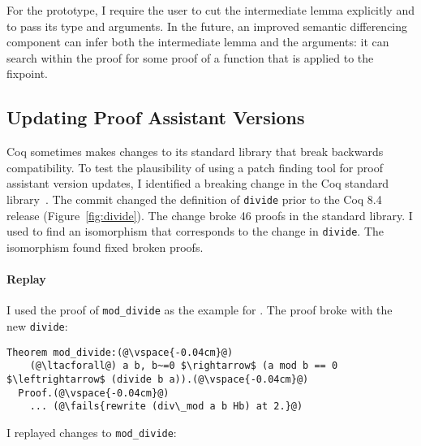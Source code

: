 For the prototype, I require the user to cut the intermediate lemma explicitly and to 
pass its type and arguments.
In the future, an improved semantic differencing component
can infer both the intermediate lemma and the arguments: it can search
within the proof for some proof of a function that is applied
to the fixpoint.

\begin{figure*}
\begin{minipage}{0.48\textwidth}
\lstset{language=coq, aboveskip=0pt,belowskip=0pt}

\end{minipage}
\hfill
\begin{minipage}{0.48\textwidth}
\lstset{language=coq, aboveskip=0pt,belowskip=0pt}

\end{minipage}
\caption[Caption for LOF]{Old (left) and new (right) definitions of \lstinline{divide} in Coq.}
\label{fig:divide}
\end{figure*}

\lstset{language=coq, aboveskip=3pt,belowskip=3pt}

\subsection{Updating Proof Assistant Versions}
\label{sec:coq}

Coq sometimes makes changes to its standard library that break
backwards compatibility.
To test the plausibility of using a patch finding tool for proof assistant version updates,
I identified a breaking change in the Coq standard library~\cite{coq84commit}.
The commit changed the definition of \lstinline{divide} prior to the Coq 8.4 release (Figure~\ref{fig:divide}).
The change broke 46 proofs in the standard library.
I used \sysname to find an isomorphism that corresponds to the change in \lstinline{divide}.
The isomorphism \sysname found fixed broken proofs.

\paragraph{Replay} I used the proof of \lstinline{mod_divide} as the example for \sysname.
The proof broke with the new \lstinline{divide}:

\begin{lstlisting}[language=coq]
  Theorem mod_divide:(@\vspace{-0.04cm}@)
    (@\ltacforall@) a b, b~=0 $\rightarrow$ (a mod b == 0 $\leftrightarrow$ (divide b a)).(@\vspace{-0.04cm}@)
  Proof.(@\vspace{-0.04cm}@)
    ... (@\fails{rewrite (div\_mod a b Hb) at 2.}@)
\end{lstlisting}
I replayed changes to \lstinline{mod_divide}:

